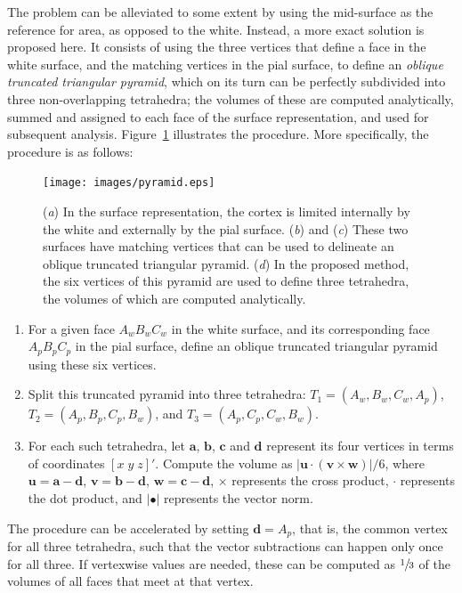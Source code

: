 The problem can be alleviated to some extent by using the mid-surface as the reference for area, as opposed to the white. Instead, a more exact solution is proposed here. It consists of using the three vertices that define a face in the white surface, and the matching vertices in the pial surface, to define an \emph{oblique truncated triangular pyramid}, which on its turn can be perfectly subdivided into three non-overlapping tetrahedra; the volumes of these are computed analytically, summed and assigned to each face of the surface representation, and used for subsequent analysis. Figure~\ref{fig:areal:pyramid} illustrates the procedure. More specifically, the procedure is as follows:

\begin{figure}[!p]
\centering
\texttt{[image: images/pyramid.eps]}
\caption[Proposed method to compute volumes in the cortex.]{(\emph{a}) In the surface representation, the cortex is limited internally by the white and externally by the pial surface. (\emph{b}) and (\emph{c}) These two surfaces have matching vertices that can be used to delineate an oblique truncated triangular pyramid. (\emph{d}) In the proposed method, the six vertices of this pyramid are used to define three tetrahedra, the volumes of which are computed analytically.}
\label{fig:areal:pyramid}
\end{figure}

\begin{enumerate}
\item For a given face $A_w B_w C_w$ in the white surface, and its corresponding face $A_p B_p C_p$ in the pial surface, define an oblique truncated triangular pyramid using these six vertices.
\item Split this truncated pyramid into three tetrahedra: $T_1 = (A_w,B_w,C_w,A_p)$, $T_2 = (A_p,B_p,C_p,B_w)$, and $T_3 = (A_p,C_p,C_w,B_w)$.
\item For each such tetrahedra, let $\mathbf{a}$, $\mathbf{b}$, $\mathbf{c}$ and $\mathbf{d}$ represent its four vertices in terms of coordinates $[x\;y\;z]'$. Compute the volume as $|\mathbf{u}\cdot(\mathbf{v} \times \mathbf{w})|/6$, where $\mathbf{u} = \mathbf{a}-\mathbf{d}$, $\mathbf{v} = \mathbf{b}-\mathbf{d}$, $\mathbf{w} = \mathbf{c}-\mathbf{d}$, $\times$ represents the cross product, $\cdot$ represents the dot product, and $|\bullet|$ represents the vector norm.
\end{enumerate}

The procedure can be accelerated by setting $\mathbf{d}=A_p$, that is, the common vertex for all three tetrahedra, such that the vector subtractions can happen only once for all three. If vertexwise values are needed, these can be computed as $\sfrac{1}{3}$ of the volumes of all faces that meet at that vertex.

